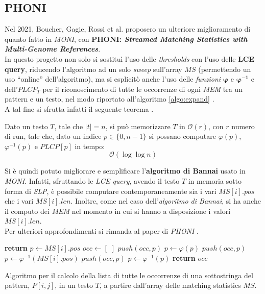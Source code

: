\subsection{PHONI}
Nel 2021, Boucher, Gagie, Rossi et al. proposero un ulteriore miglioramento di
quanto fatto in \textit{MONI}, con \textbf{PHONI: \textit{Streamed Matching
    Statistics with Multi-Genome References}}.\\
In questo progetto non solo si sostituì l'uso delle \textit{thresholds} con
l'uso delle \textbf{LCE query}, riducendo l'algoritmo ad un solo \textit{sweep}
sull'array $MS$ (permettendo un uso ``online'' dell'algoritmo), ma si
esplicitò anche l'uso delle \textit{funzioni} $\mathbf{\varphi}$ e
$\mathbf{\varphi^{-1}}$ e dell'$PLCP_T$ per il riconoscimento di tutte le
occorrenze di ogni \textit{MEM} tra un pattern e un testo, nel modo 
riportato all'algoritmo \ref{algo:expand} \cite{phoni}.\\
A tal fine si sfrutta infatti il seguente teorema \cite{gagie2020}.
\begin{teorema}
  Dato un testo $T$, tale che $|t|=n$, si può memorizzare $T$ in
  $\mathcal{O}(r)$, con $r$ numero di run, tale che, dato un indice
  $p\in\{0,n-1\}$ si possano computare $\varphi(p)$, $\varphi^{-1}(p)$ e
  $PLCP[p]$ in tempo:
  \[\mathcal{O}(\log\log n)\]
\end{teorema}
Si è quindi potuto migliorare e semplificare l'\textbf{algoritmo di Bannai}
usato in \textit{MONI}. Infatti, sfruttando le
\textit{LCE query}, avendo il testo $T$ in memoria sotto forma di \textit{SLP},
è possibile computare contemporaneamente sia i vari
$MS[i].pos$ che i vari $MS[i].len$. Inoltre, come nel caso dell'\textit{algoritmo
  di Bannai}, si ha anche il computo dei \textit{MEM} nel momento in cui si
hanno a 
disposizione i valori $MS[i].len$.\\ 
Per ulteriori approfondimenti si rimanda al paper di \textit{PHONI}
\cite{phoni}.

\begin{algorithm}
  \begin{algorithmic}[1]
    \State \textbf{return}
    \EndIf
    \State $p\gets MS[i].pos$
    \State $occ\gets [\,\,]$
    \State $push(occ, p)$
    \State $p\gets \varphi(p)$
    \State $push(occ, p)$
    \EndWhile
    \State $p\gets \varphi^{-1}(MS[i].pos)$
    \State $push(occ, p)$
    \State $p\gets \varphi^{-1}(p)$
    \EndWhile
    \State \textbf{return} $occ$
    \EndFunction
  \end{algorithmic}
  \caption{Algoritmo per il calcolo della lista di tutte le occorrenze di una
  sottostringa del pattern, $P[i,j]$, in un testo $T$, a partire dall'array
  delle matching statistics $MS$.}
  \label{algo:expand}
\end{algorithm}